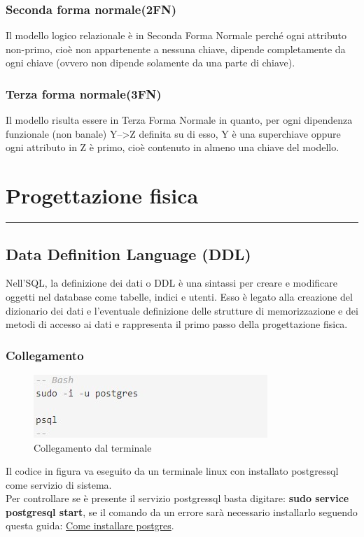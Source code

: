 \documentclass[legalpaper]{article}
\begin{document}
\subsubsection{Seconda forma normale(2FN)}
	Il modello logico relazionale è in Seconda Forma Normale perché ogni attributo non-primo, cioè non appartenente a nessuna chiave, dipende completamente da ogni chiave (ovvero non dipende solamente da una parte di chiave).
\subsubsection{Terza forma normale(3FN)}
	Il modello risulta essere in Terza Forma Normale in quanto, per ogni dipendenza funzionale (non banale) Y-->Z definita su di esso, Y è una superchiave oppure ogni attributo in Z è primo, cioè contenuto in almeno una chiave del modello.
\newpage
\section{Progettazione fisica}
\rule{\linewidth}{1.5pt}
\subsection{Data Definition Language (DDL)}
	Nell'SQL, la definizione dei dati o DDL è una sintassi per creare e modificare oggetti nel database come tabelle, indici e utenti. Esso è legato alla creazione del dizionario dei dati e l'eventuale definizione delle strutture di memorizzazione e dei metodi di accesso ai dati e rappresenta il primo passo della progettazione fisica.	\\
	\subsubsection{Collegamento}
		\begin{figure}[h]
			\centering
			\includegraphics[width=0.5\linewidth]{Immagini SQL/collegamento}
			\caption{Collegamento dal terminale}
			\label{collegamentobash}
		\end{figure}
		Il codice in figura va eseguito da un terminale linux con installato postgressql come servizio di sistema.\\
		Per controllare se è presente il servizio postgressql basta digitare: \textbf{sudo service postgresql start}, 
		se il comando da un errore sarà necessario installarlo seguendo questa guida:
		 \href{https://linuxize.com/post/how-to-install-postgresql-on-debian-10/}{Come installare postgres}.\\
\end{document}
